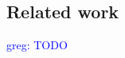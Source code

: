\documentclass[sigconf]{acmart}
\newcommand\greg[1]{\textcolor{blue}{greg: #1}}
\begin{document}
	\subsection{Related work}
	\greg{TODO}
	
%	
%	
\end{document}
